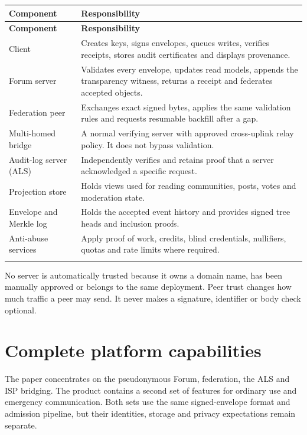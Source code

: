 \documentclass[12pt,a4paper]{article}
\begin{document}
\begin{small}
\begin{longtable}{@{}>{\raggedright\arraybackslash}p{}>{\raggedright\arraybackslash}p{}@{}}
\toprule
\textbf{Component} & \textbf{Responsibility} \\
\midrule
\endfirsthead
\toprule
\textbf{Component} & \textbf{Responsibility} \\
\midrule
\endhead
\bottomrule
\endfoot
Client & Creates keys, signs envelopes, queues writes, verifies receipts, stores audit certificates and displays provenance. \\
\addlinespace[2pt]
Forum server & Validates every envelope, updates read models, appends the transparency witness, returns a receipt and federates accepted objects. \\
\addlinespace[2pt]
Federation peer & Exchanges exact signed bytes, applies the same validation rules and requests resumable backfill after a gap. \\
\addlinespace[2pt]
Multi-homed bridge & A normal verifying server with approved cross-uplink relay policy. It does not bypass validation. \\
\addlinespace[2pt]
Audit-log server (ALS) & Independently verifies and retains proof that a server acknowledged a specific request. \\
\addlinespace[2pt]
Projection store & Holds views used for reading communities, posts, votes and moderation state. \\
\addlinespace[2pt]
Envelope and Merkle log & Holds the accepted event history and provides signed tree heads and inclusion proofs. \\
\addlinespace[2pt]
Anti-abuse services & Apply proof of work, credits, blind credentials, nullifiers, quotas and rate limits where required. \\
\addlinespace[2pt]
\end{longtable}
\end{small}
No server is automatically trusted because it owns a domain name, has been manually approved or belongs to the same deployment. Peer trust changes how much traffic a peer may send. It never makes a signature, identifier or body check optional.

\section*{Complete platform capabilities}
The paper concentrates on the pseudonymous Forum, federation, the ALS and ISP bridging. The product contains a second set of features for ordinary use and emergency communication. Both sets use the same signed-envelope format and admission pipeline, but their identities, storage and privacy expectations remain separate.
\end{document}

